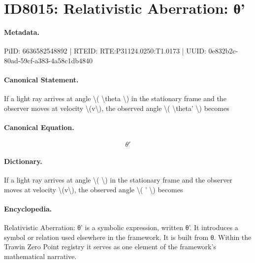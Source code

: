 \section*{ID8015: Relativistic Aberration: θ'}
\paragraph{Metadata.}
PiID: 6636582548892 | RTEID: RTE:P31124.0250:T1.0173 | UUID: 0e832b2c-80ad-59cf-a383-4a58c1db4840

\paragraph{Canonical Statement.}
If a light ray arrives at angle \textbackslash{}( \textbackslash{}theta \textbackslash{}) in the stationary frame and the observer moves at velocity \textbackslash{}(v\textbackslash{}), the observed angle \textbackslash{}( \textbackslash{}theta' \textbackslash{}) becomes

\paragraph{Canonical Equation.}
\[
\theta'
\]

\paragraph{Dictionary.}
If a light ray arrives at angle \textbackslash{}( \textbackslash{}) in the stationary frame and the observer moves at velocity \textbackslash{}(v\textbackslash{}), the observed angle \textbackslash{}( ' \textbackslash{}) becomes

\paragraph{Encyclopedia.}
Relativistic Aberration: θ' is a symbolic expression, written θ'. It introduces a symbol or relation used elsewhere in the framework. It is built from θ. Within the Trawin Zero Point registry it serves as one element of the framework's mathematical narrative.
